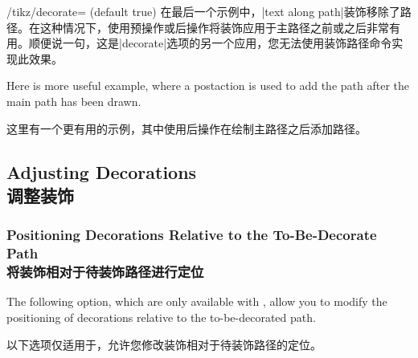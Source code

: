 \begin{key}{/tikz/decorate= (default true)}
    在最后一个示例中，|text along path|装饰移除了路径。在这种情况下，使用预操作或后操作将装饰应用于主路径之前或之后非常有用。顺便说一句，这是|decorate|选项的另一个应用，您无法使用装饰路径命令实现此效果。


\begin{codeexample}[preamble={\usetikzlibrary{
    decorations.pathmorphing,
    decorations.text,
    shapes.geometric,
}}]
\end{codeexample}
    Here is more useful example, where a postaction is used to add the path
    after the main path has been drawn.
    
    这里有一个更有用的示例，其中使用后操作在绘制主路径之后添加路径。


\begin{codeexample}[preamble={\usetikzlibrary{decorations.text}}]
\end{codeexample}
\end{key}


\subsection{Adjusting Decorations\\调整装饰}
\label{section-decorations-adjust}

\subsubsection{Positioning Decorations Relative to the To-Be-Decorate Path\\将装饰相对于待装饰路径进行定位}

The following option, which are only available with \tikzname, allow you to
modify the positioning of decorations relative to the to-be-decorated path.

以下选项仅适用于\tikzname，允许您修改装饰相对于待装饰路径的定位。


